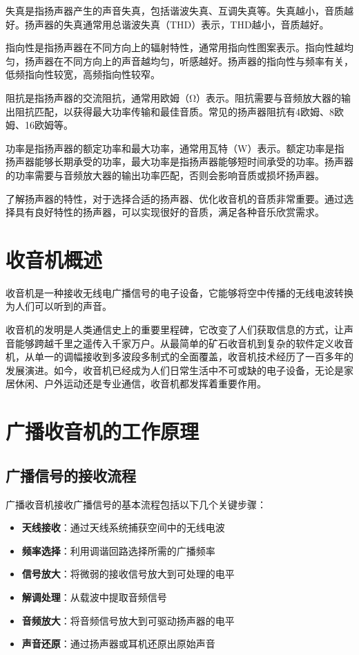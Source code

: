 \documentclass[12pt,UTF8]{ctexbook}
\begin{document}
失真是指扬声器产生的声音失真，包括谐波失真、互调失真等。失真越小，音质越好。扬声器的失真通常用总谐波失真（THD）表示，THD越小，音质越好。

指向性是指扬声器在不同方向上的辐射特性，通常用指向性图案表示。指向性越均匀，扬声器在不同方向上的声音越均匀，听感越好。扬声器的指向性与频率有关，低频指向性较宽，高频指向性较窄。

阻抗是指扬声器的交流阻抗，通常用欧姆（Ω）表示。阻抗需要与音频放大器的输出阻抗匹配，以获得最大功率传输和最佳音质。常见的扬声器阻抗有4欧姆、8欧姆、16欧姆等。

功率是指扬声器的额定功率和最大功率，通常用瓦特（W）表示。额定功率是指扬声器能够长期承受的功率，最大功率是指扬声器能够短时间承受的功率。扬声器的功率需要与音频放大器的输出功率匹配，否则会影响音质或损坏扬声器。

了解扬声器的特性，对于选择合适的扬声器、优化收音机的音质非常重要。通过选择具有良好特性的扬声器，可以实现很好的音质，满足各种音乐欣赏需求。

\section{收音机概述}

收音机是一种接收无线电广播信号的电子设备，它能够将空中传播的无线电波转换为人们可以听到的声音。

收音机的发明是人类通信史上的重要里程碑，它改变了人们获取信息的方式，让声音能够跨越千里之遥传入千家万户。从最简单的矿石收音机到复杂的软件定义收音机，从单一的调幅接收到多波段多制式的全面覆盖，收音机技术经历了一百多年的发展演进。如今，收音机已经成为人们日常生活中不可或缺的电子设备，无论是家居休闲、户外运动还是专业通信，收音机都发挥着重要作用。

\section{广播收音机的工作原理}

\subsection{广播信号的接收流程}

广播收音机接收广播信号的基本流程包括以下几个关键步骤：

\begin{itemize}[leftmargin=3.5em]
    \item \textbf{天线接收}：通过天线系统捕获空间中的无线电波
    \item \textbf{频率选择}：利用调谐回路选择所需的广播频率
    \item \textbf{信号放大}：将微弱的接收信号放大到可处理的电平
    \item \textbf{解调处理}：从载波中提取音频信号
    \item \textbf{音频放大}：将音频信号放大到可驱动扬声器的电平
    \item \textbf{声音还原}：通过扬声器或耳机还原出原始声音
\end{itemize}
\end{document}
